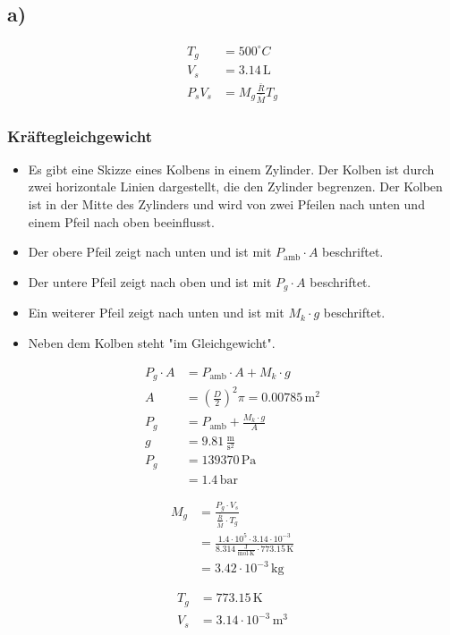 

\subsection*{a)}

\begin{align*}
T_g &= 500^\circ C \\
V_s &= 3.14 \, \text{L} \\
P_s V_s &= M_g \frac{\bar{R}}{\bar{M}} T_g
\end{align*}

\subsubsection*{Kräftegleichgewicht}

\begin{itemize}
    \item Es gibt eine Skizze eines Kolbens in einem Zylinder. Der Kolben ist durch zwei horizontale Linien dargestellt, die den Zylinder begrenzen. Der Kolben ist in der Mitte des Zylinders und wird von zwei Pfeilen nach unten und einem Pfeil nach oben beeinflusst.
    \item Der obere Pfeil zeigt nach unten und ist mit $P_{\text{amb}} \cdot A$ beschriftet.
    \item Der untere Pfeil zeigt nach oben und ist mit $P_g \cdot A$ beschriftet.
    \item Ein weiterer Pfeil zeigt nach unten und ist mit $M_k \cdot g$ beschriftet.
    \item Neben dem Kolben steht "im Gleichgewicht".
\end{itemize}

\begin{align*}
P_g \cdot A &= P_{\text{amb}} \cdot A + M_k \cdot g \\
A &= \left( \frac{D}{2} \right)^2 \pi = 0.00785 \, \text{m}^2 \\
P_g &= P_{\text{amb}} + \frac{M_k \cdot g}{A} \\
g &= 9.81 \, \frac{\text{m}}{\text{s}^2} \\
P_g &= 139370 \, \text{Pa} \\
&= 1.4 \, \text{bar}
\end{align*}

\begin{align*}
M_g &= \frac{P_g \cdot V_s}{\frac{\bar{R}}{\bar{M}} \cdot T_g} \\
&= \frac{1.4 \cdot 10^5 \cdot 3.14 \cdot 10^{-3}}{8.314 \, \frac{\text{J}}{\text{mol} \cdot \text{K}} \cdot 773.15 \, \text{K}} \\
&= 3.42 \cdot 10^{-3} \, \text{kg}
\end{align*}

\begin{align*}
T_g &= 773.15 \, \text{K} \\
V_s &= 3.14 \cdot 10^{-3} \, \text{m}^3
\end{align*}